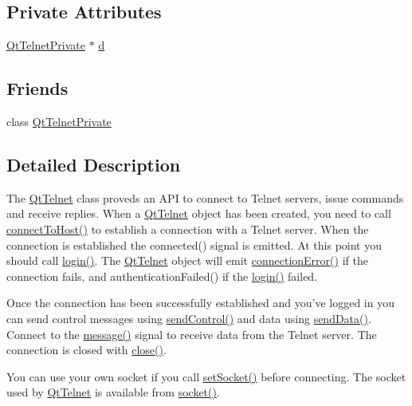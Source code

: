 \subsection*{Private Attributes}
\begin{DoxyCompactItemize}
\item 
\hyperlink{classQtTelnetPrivate}{QtTelnetPrivate} $\ast$ \hyperlink{classQtTelnet_a1622dba7b3536ecf918543995d89c14c}{d}
\end{DoxyCompactItemize}
\subsection*{Friends}
\begin{DoxyCompactItemize}
\item 
class \hyperlink{classQtTelnet_ad680c25404e0d6ccdf3e8a5a6cf36502}{QtTelnetPrivate}
\end{DoxyCompactItemize}


\subsection{Detailed Description}
The \hyperlink{classQtTelnet}{QtTelnet} class proveds an API to connect to Telnet servers, issue commands and receive replies. When a \hyperlink{classQtTelnet}{QtTelnet} object has been created, you need to call \hyperlink{classQtTelnet_a226897664d5b148a31d811acb964cc91}{connectToHost()} to establish a connection with a Telnet server. When the connection is established the connected() signal is emitted. At this point you should call \hyperlink{classQtTelnet_a2142cdc1a44a56e3037529dde6f5c9ca}{login()}. The \hyperlink{classQtTelnet}{QtTelnet} object will emit \hyperlink{classQtTelnet_ab6e03a94fcb63d1393dfb7edda5c8a03}{connectionError()} if the connection fails, and authenticationFailed() if the \hyperlink{classQtTelnet_a2142cdc1a44a56e3037529dde6f5c9ca}{login()} failed.

Once the connection has been successfully established and you've logged in you can send control messages using \hyperlink{classQtTelnet_aad51391ddbdae2c34a493f2d9ce68eae}{sendControl()} and data using \hyperlink{classQtTelnet_a9f48197f4356c4550e7b258daf89fb02}{sendData()}. Connect to the \hyperlink{classQtTelnet_affc0f7c1666a379e18ff11bdc09f90d8}{message()} signal to receive data from the Telnet server. The connection is closed with \hyperlink{classQtTelnet_af3a32007f06949b28cee13ccbfbe1041}{close()}.

You can use your own socket if you call \hyperlink{classQtTelnet_a4d9b0d3d024344f5319cdf5cde1f647a}{setSocket()} before connecting. The socket used by \hyperlink{classQtTelnet}{QtTelnet} is available from \hyperlink{classQtTelnet_a76817174fd5ca030ab5a40a1b5735e79}{socket()}. 

